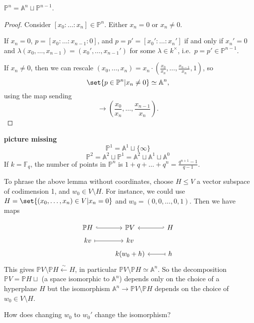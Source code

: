 \documentclass{article}
\newcommand{\A}{\mathbb{A}}
\newcommand{\F}{\mathbb{F}}
\newcommand{\proj}{\mathbb{P}}
\begin{document}
\begin{lemma}
    $\mathbb{P}^n = \A^n \sqcup \mathbb{P}^{n-1}$.
\end{lemma}
\begin{proof}
    Consider $[x_0 : \dotsc : x_n] \in \mathbb{P}^n$. Either $x_n = 0$ or $x_n \neq 0$.

    If $x_n = 0$, $p = [x_0 : \dotsc : x_{n-1} : 0]$, and $p = p' = [x_0' : \dotsc : x_n']$ if and only if $x_n' =0$ and $\lambda(x_0, \dotsc, x_{n-1}) = (x_0', \dotsc, x_{n-1}')$ for some $\lambda \in k^\times$, i.e.\ $p = p' \in \mathbb{P}^{n-1}$.

    If $x_n \neq 0$, then we can rescale $(x_0, \dotsc, x_n) = x_n \cdot (\frac{x_0}{x_n}, \dotsc, \frac{x_{n-1}}{x_n}, 1)$, so
    \begin{equation*}\set{p \in \mathbb{P}^n | x_n \neq 0} \simeq \A^n,\end{equation*}
    using the map sending
    \begin{equation*}[x_0 : \dotsc : x_n] \to \left(\frac{x_0}{x_n}, \dotsc, \frac{x_{n-1}}{x_n}\right).\end{equation*}\qedhere
\end{proof}
\begin{eg}
    \textbf{picture missing}
    \begin{equation*}\mathbb{P}^1 = \A^1 \sqcup \{\infty\}\end{equation*}
    \begin{equation*}
        \mathbb{P}^2 = \A^2 \sqcup \mathbb{P}^1 = \A^2 \sqcup \A^1 \sqcup \A^0
    \end{equation*}
    If $k = \F_q$, the number of points in $\mathbb{P}^n$ is $1 + q + \dotsc + q^n = \frac{q^{n+1}-1}{q-1}$.
\end{eg}
To phrase the above lemma without coordinates, choose $H \leq V$ a vector subspace of codimension 1, and $w_0 \in V \setminus H$.
For instance, we could use $H = \set{(x_0, \dotsc, x_n) \in V | x_n = 0}$ and $w_0 = (0, 0, \dotsc, 0, 1)$.
Then we have maps

\begin{equation*}
    \begin{tikzcd}[row sep=tiny]
        \proj H \rar[hook] & \proj V & H \lar[hook'] \\
        kv \rar[mapsto] & k v \\
                        & k(w_0 + h) \rar[mapsfrom] & h
    \end{tikzcd}
\end{equation*}
This gives $\mathbb{P}V \setminus \mathbb{P}H \xleftarrow{\sim} H$, in particular $\mathbb{P}V \setminus \mathbb{P}H \simeq \A^n$.
So the decomposition $\mathbb{P}V = \mathbb{P}H \sqcup$ (a space isomorphic to $\A^n$) depends only on the choice of a hyperplane $H$ but the isomorphism $\A^n \to \mathbb{P}V \setminus \mathbb{P}H$ depends on the choice of $w_0 \in V \setminus H$.
\begin{ex}
How does changing $w_0$ to $w_0'$ change the isomorphism?
\end{ex}
\end{document}
